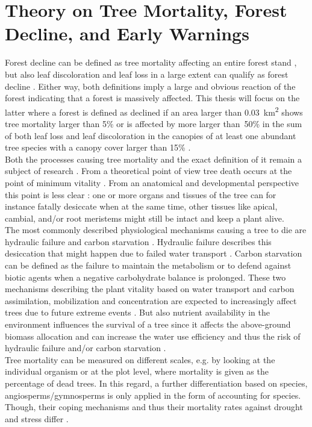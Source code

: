 \section{Theory on Tree Mortality, Forest Decline, and Early Warnings}\label{sec:theory}
Forest decline can be defined as tree mortality affecting an entire forest stand \citep{martinez2012}, but also leaf discoloration and leaf loss in a large extent can qualify as forest decline \citep{chaparro2017}. Either way, both definitions imply a large and obvious reaction of the forest indicating that a forest is massively affected. This thesis will focus on the latter where a forest is defined as declined if an area larger than 0.03~km\textsuperscript{2} shows tree mortality larger than 5\% or is affected by more larger than~50\% in the sum of both leaf loss and leaf discoloration in the canopies of at least one abundant tree species with a canopy cover larger than 15\% \citep{chaparro2017}.\\
Both the processes causing tree mortality and the exact definition of it remain a subject of research \citep{hartmann2015}. From a theoretical point of view tree death occurs at the point of minimum vitality \citep{dobbertin2005, grivcar2012}. From an anatomical and developmental perspective this point is less clear \citep{schenk2008}: one or more organs and tissues of the tree can for instance fatally desiccate when at the same time, other tissues like apical, cambial, and/or root meristems might still be intact and keep a plant alive.\\
The most commonly described physiological mechanisms causing a tree to die are hydraulic failure and carbon starvation \citep{sevanto2014}. Hydraulic failure describes this desiccation that might happen due to failed water transport \citep{mcdowell2011b}. Carbon starvation can be defined as the failure to maintain the metabolism or to defend against biotic agents when a negative carbohydrate balance is prolonged. These two mechanisms describing the plant vitality based on water transport and carbon assimilation, mobilization and concentration are expected to increasingly affect trees due to future extreme events \citep{brauning2017}. But also nutrient availability in the environment influences the survival of a tree since it affects the above-ground biomass allocation and can increase the water use efficiency and thus the risk of hydraulic failure and/or carbon starvation \citep{gessler2017}.\\
Tree mortality can be measured on different scales, e.g. by looking at the individual organism or at the plot level, where mortality is given as the percentage of dead trees. In this regard, a further differentiation based on species, angiosperms/gymnosperms is only applied in the form of accounting for species. Though, their coping mechanisms and thus their mortality rates against drought and stress differ  \citep[e.g.][]{chaparro2017}.\\

